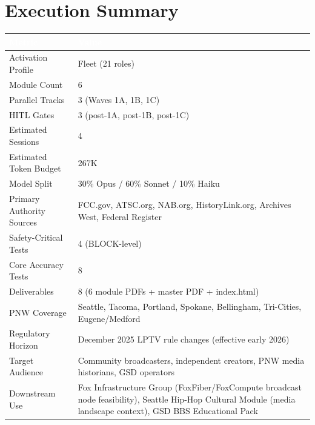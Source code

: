 \documentclass[11pt,letterpaper]{article}
\newcommand{\tableheader}[1]{\textbf{\sffamily\textcolor{white}{#1}}}
\begin{document}
\section{Execution Summary}

\begin{center}
\begin{tabularx}{\textwidth}{L{4cm}X}
\toprule
{}
\tableheader{Metric} & \tableheader{Value} \\
\midrule
Activation Profile & Fleet (21 roles) \\
Module Count & 6 \\
Parallel Tracks & 3 (Waves 1A, 1B, 1C) \\
HITL Gates & 3 (post-1A, post-1B, post-1C) \\
Estimated Sessions & 4 \\
Estimated Token Budget & 267K \\
Model Split & 30\% Opus / 60\% Sonnet / 10\% Haiku \\
Primary Authority Sources & FCC.gov, ATSC.org, NAB.org, HistoryLink.org, Archives West, Federal Register \\
Safety-Critical Tests & 4 (BLOCK-level) \\
Core Accuracy Tests & 8 \\
Deliverables & 8 (6 module PDFs + master PDF + index.html) \\
PNW Coverage & Seattle, Tacoma, Portland, Spokane, Bellingham, Tri-Cities, Eugene/Medford \\
Regulatory Horizon & December 2025 LPTV rule changes (effective early 2026) \\
Target Audience & Community broadcasters, independent creators, PNW media historians, GSD operators \\
Downstream Use & Fox Infrastructure Group (FoxFiber/FoxCompute broadcast node feasibility), Seattle Hip-Hop Cultural Module (media landscape context), GSD BBS Educational Pack \\
\bottomrule
\end{tabularx}
\end{center}

\vspace{2em}
\end{document}

